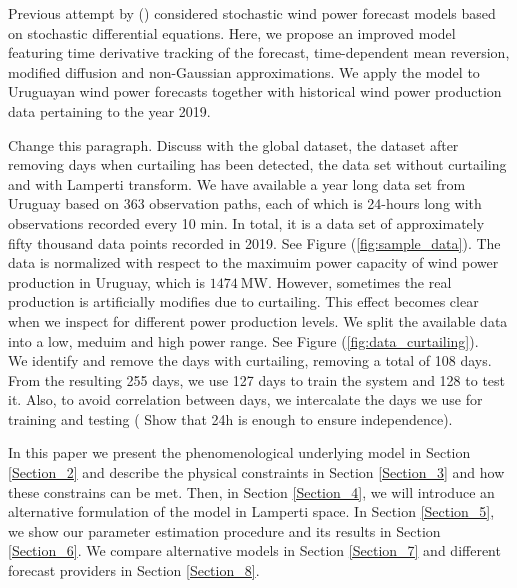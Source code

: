 \documentclass[11pt]{article}
\begin{document}
Previous attempt by (\cite{mozuma}) considered stochastic wind power forecast models based on stochastic differential equations. Here, we propose an improved model featuring time derivative tracking of the forecast, time-dependent mean reversion, modified diffusion and non-Gaussian approximations. We apply the model to Uruguayan wind power forecasts together with historical wind power production data pertaining to the year 2019.

{\color{red} Change this paragraph. Discuss with the global dataset, the dataset after removing days when curtailing has been detected, the data set without curtailing and with Lamperti transform.}
We have available a year long data set from Uruguay based on 363 observation paths, each of which is 24-hours long with observations recorded every 10 min. In total, it is a data set of approximately fifty thousand data points recorded in 2019. See Figure (\ref{fig:sample_data}). The data is normalized with respect to the maximuim power capacity of wind power production in Uruguay, which is $\SI{1474}{\mega\watt}$. However, sometimes the real production is artificially modifies due to curtailing. This effect becomes clear when we inspect for different power production levels. We split the available data into a low, meduim and high power range. See Figure (\ref{fig:data_curtailing}).\\
We identify and remove the days with curtailing, removing a total of 108 days. From the resulting 255 days, we use 127 days to train the system and 128 to test it. Also, to avoid correlation between days, we intercalate the days we use for training and testing ({\color{red} Show that 24h is enough to ensure independence}).

In this paper we present the phenomenological underlying model in Section \ref{Section_2} and describe the physical constraints in Section \ref{Section_3} and how these constrains can be met. Then, in Section \ref{Section_4}, we will introduce an alternative formulation of the model in Lamperti space. In Section \ref{Section_5}, we show our parameter estimation procedure and its results in Section \ref{Section_6}. We compare alternative models in Section \ref{Section_7} and different forecast providers in Section \ref{Section_8}.
\end{document}
